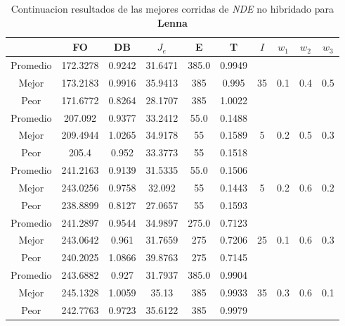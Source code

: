 \begin{table}[h!]
    \footnotesize
    \begin{center}
        \begin{tabular}{|c|c|c|c|c|c|c|c|c|c|}
        \hline
            & {\bf FO} & {\bf DB} & $J_e$ & {\bf E} & {\bf T} & $I$ & $w_1$ & $w_2$ & $w_3$ \\
        \hline
        \hline
            Promedio  & 172.3278 & 0.9242 & 31.6471 & 385.0 & 0.9949 &  &  &  & \\
            \cline{1-6}
            Mejor & 173.2183 & 0.9916  & 35.9413 & 385 & 0.995 & 35 & 0.1 & 0.4 & 0.5\\
            \cline{1-6}
            Peor & 171.6772 & 0.8264  & 28.1707 & 385 & 1.0022 &  &  &  & \\
        \hline
        \hline
            Promedio  & 207.092 & 0.9377 & 33.2412 & 55.0 & 0.1488 &  &  &  & \\
            \cline{1-6}
            Mejor & 209.4944 & 1.0265  & 34.9178 & 55 & 0.1589 & 5 & 0.2 & 0.5 & 0.3\\
            \cline{1-6}
            Peor & 205.4 & 0.952  & 33.3773 & 55 & 0.1518 &  &  &  & \\
        \hline
        \hline
            Promedio  & 241.2163 & 0.9139 & 31.5335 & 55.0 & 0.1506 &  &  &  & \\
            \cline{1-6}
            Mejor & 243.0256 & 0.9758  & 32.092 & 55 & 0.1443 & 5 & 0.2 & 0.6 & 0.2\\
            \cline{1-6}
            Peor & 238.8899 & 0.8127  & 27.0657 & 55 & 0.1593 &  &  &  & \\
        \hline
        \hline
            Promedio  & 241.2897 & 0.9544 & 34.9897 & 275.0 & 0.7123 &  &  &  & \\
            \cline{1-6}
            Mejor & 243.0642 & 0.961  & 31.7659 & 275 & 0.7206 & 25 & 0.1 & 0.6 & 0.3\\
            \cline{1-6}
            Peor & 240.2025 & 1.0866  & 39.8763 & 275 & 0.7145 &  &  &  & \\
        \hline
        \hline
            Promedio  & 243.6882 & 0.927 & 31.7937 & 385.0 & 0.9904 &  &  &  & \\
            \cline{1-6}
            Mejor & 245.1328 & 1.0059  & 35.13 & 385 & 0.9933 & 35 & 0.3 & 0.6 & 0.1\\
            \cline{1-6}
            Peor & 242.7763 & 0.9723  & 35.6122 & 385 & 0.9979 &  &  &  & \\
        \hline
        \end{tabular}
        \caption{Continuacion resultados de las mejores corridas de \emph{NDE} no hibridado para {\bf Lenna}}
        \label{tb:tabledealgimgc}
    \end{center}
\end{table}
